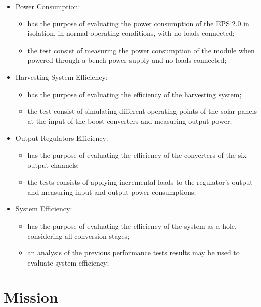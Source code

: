 \begin{itemize}
    \item Power Consumption:
    \begin{itemize}
        \item has the purpose of evaluating the power consumption of the EPS 2.0 in isolation, in normal operating conditions, with no loads connected;
        \item the test consist of measuring the power consumption of the module when powered through a bench power supply and no loads connected;
    \end{itemize}

    \item Harvesting System Efficiency:
    \begin{itemize}
        \item has the purpose of evaluating the efficiency of the harvesting system;
        \item the test consist of simulating different operating points of the solar panels at the input of the boost converters and measuring output power;
    \end{itemize}

    \item Output Regulators Efficiency:
    \begin{itemize}
        \item has the purpose of evaluating the efficiency of the converters of the six output channels;
        \item the tests consists of applying incremental loads to the regulator's output and measuring input and output power consumptions;
    \end{itemize}

    \item System Efficiency:
    \begin{itemize}
        \item has the purpose of evaluating the efficiency of the system as a hole, considering all conversion stages;
        \item an analysis of the previous performance tests results may be used to evaluate system efficiency;
    \end{itemize}

\end{itemize}



\section{Mission}

